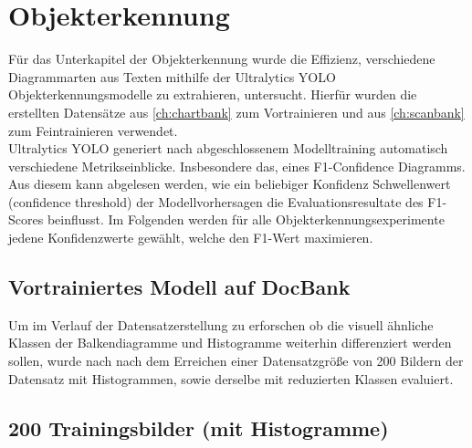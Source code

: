 \section{Objekterkennung}

Für das Unterkapitel der Objekterkennung wurde die Effizienz, verschiedene Diagrammarten aus Texten mithilfe der Ultralytics YOLO Objekterkennungsmodelle zu extrahieren, untersucht. Hierfür wurden die erstellten Datensätze aus \ref{ch:chartbank} zum Vortrainieren und aus \ref{ch:scanbank} zum Feintrainieren verwendet.
\\
Ultralytics YOLO generiert nach abgeschlossenem Modelltraining automatisch verschiedene Metrikseinblicke. Insbesondere das, eines F1-Confidence Diagramms. Aus diesem kann abgelesen werden, wie ein beliebiger Konfidenz Schwellenwert (confidence threshold) der Modellvorhersagen die Evaluationsresultate des F1-Scores beinflusst. Im Folgenden werden für alle Objekterkennungsexperimente jedene Konfidenzwerte gewählt, welche den F1-Wert maximieren.

\subsection{Vortrainiertes Modell auf DocBank}
Um im Verlauf der Datensatzerstellung zu erforschen ob die visuell ähnliche Klassen der Balkendiagramme und Histogramme weiterhin differenziert werden sollen, wurde nach nach dem Erreichen einer Datensatzgröße von 200 Bildern der Datensatz mit Histogrammen, sowie derselbe mit reduzierten Klassen evaluiert.

\subsection*{200 Trainingsbilder (mit Histogramme)}

